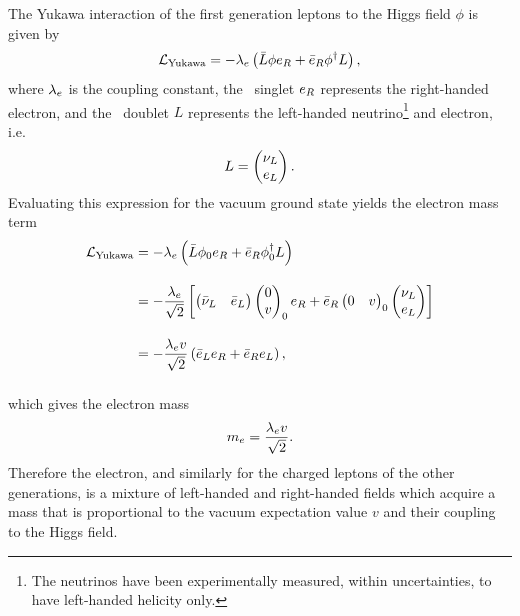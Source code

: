 The Yukawa interaction of the first generation leptons to the Higgs field $\phi$ is given by
\begin{equation}
  \mathcal{L}_{\mathrm{Yukawa}} = -\lambda_{e} \left( \bar{L} \phi e_{R} + \bar{e}_{R} \phi^{\dag} L\right),
\end{equation}
where $\lambda_{e}$ is the coupling constant, the \symWEAK\ singlet $e_{R}$ represents the right-handed electron, and the \symWEAK\ doublet $L$ represents the left-handed neutrino\footnote{The neutrinos have been experimentally measured, within uncertainties, to have left-handed helicity only.} and electron, i.e.
\begin{equation}
  L = \begin{pmatrix} \nu_{L} \\ e_{L} \\ \end{pmatrix}.
\end{equation}
Evaluating this expression for the vacuum ground state yields the electron mass term
\begin{align}
  \begin{split}
    \mathcal{L}_{\mathrm{Yukawa}} &= -\lambda_{e} \left( \bar{L} \phi_{0} e_{R} + \bar{e}_{R} \phi_{0}^{\dag} L\right) \\[1em]
                                  &= -\frac{\lambda_{e}}{\sqrt{2}} \left[ \begin{pmatrix} \bar{\nu}_{L} & \bar{e}_{L} \\ \end{pmatrix} \begin{pmatrix} 0 \\ v \\ \end{pmatrix}_{0} e_{R} + \bar{e}_{R} \begin{pmatrix} 0 & v \\ \end{pmatrix}_{0} \begin{pmatrix} \nu_{L} \\ e_{L} \\ \end{pmatrix} \right] \\[1em]
                                  &= -\frac{\lambda_{e}v}{\sqrt{2}} \left( \bar{e}_{L} e_{R} + \bar{e}_{R} e_{L} \right), \\[1em]
  \end{split}
\end{align}
which gives the electron mass
\begin{equation}
  m_{e} = \frac{\lambda_{e}v}{\sqrt{2}}.
\end{equation}
Therefore the electron, and similarly for the charged leptons of the other generations, is a mixture of left-handed and right-handed fields which acquire a mass that is proportional to the vacuum expectation value $v$ and their coupling to the Higgs field.


